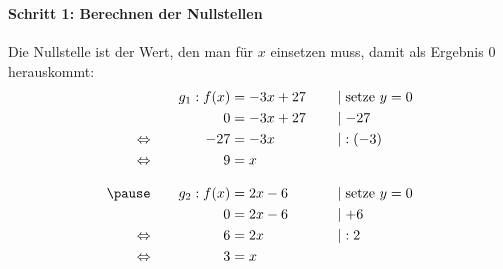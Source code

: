 \documentclass
[
  fontsize = 10pt,
  compress = true,
  ngerman,
  dvipsnames
]
{beamer}
\begin{document}
\begin{frame}
  \frametitle{\sectiontitle}
  \framesubtitle{Schritt 1: Berechnen der Nullstellen}
  Die Nullstelle ist der Wert, den man für $x$ einsetzen muss,
  damit als Ergebnis 0 herauskommt:
  \begin{alignat*}{3}
                   &\quad & g_1:f(x)&=-3x+27 & \quad&\mid\text{setze $y=0$} \\
                   &\quad &        0&=-3x+27 & \quad&\mid-27                \\
    \Leftrightarrow&\quad &      -27&=-3x    & \quad&\mid\;:(-3)            \\
    \Leftrightarrow&\quad &        9&=x      & \quad&                       \\[2ex]
    \pause
                   &\quad & g_2:f(x)&=2x-6 & \quad&\mid\text{setze $y=0$}   \\
                   &\quad &        0&=2x-6 & \quad&\mid+6                   \\
    \Leftrightarrow&\quad &        6&=2x   & \quad&\mid\;:2                 \\
    \Leftrightarrow&\quad &        3&=x    & \quad&
  \end{alignat*}
\end{frame}
\end{document}
